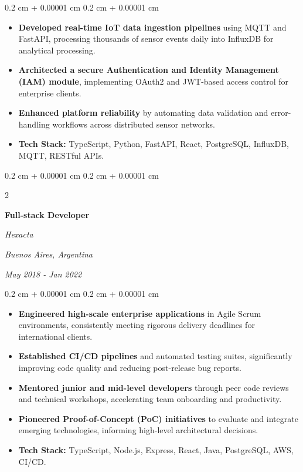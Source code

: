 \documentclass[10pt, letterpaper]{article}
\newenvironment{highlights}{
    \begin{itemize}[
        topsep=0.10 cm,
        parsep=0.10 cm,
        partopsep=0pt,
        itemsep=0pt,
        leftmargin=0.4 cm + 10pt
    ]
}{
    \end{itemize}
} %
\newenvironment{onecolentry}{
    \begin{adjustwidth}{
        0.2 cm + 0.00001 cm
    }{
        0.2 cm + 0.00001 cm
    }
}{
    \end{adjustwidth}
} %
\newenvironment{twocolentry}[2][]{
    \onecolentry
    \def\secondColumn{#2}
    \setcolumnwidth{\fill, 4.5 cm}
    \begin{paracol}{2}
}{
    \switchcolumn \raggedleft \secondColumn
    \end{paracol}
    \endonecolentry
} %
\begin{document}
        \vspace{0.10 cm}
        \begin{onecolentry}
            \begin{highlights}
                \item \textbf{Developed real-time IoT data ingestion pipelines} using MQTT and FastAPI, processing thousands of sensor events daily into InfluxDB for analytical processing.
                \item \textbf{Architected a secure Authentication and Identity Management (IAM) module}, implementing OAuth2 and JWT-based access control for enterprise clients.
                \item \textbf{Enhanced platform reliability} by automating data validation and error-handling workflows across distributed sensor networks.
                \item \textbf{Tech Stack:} TypeScript, Python, FastAPI, React, PostgreSQL, InfluxDB, MQTT, RESTful APIs.
            \end{highlights}
        \end{onecolentry}


        \vspace{0.2 cm}

        \begin{twocolentry}{
        \textit{Buenos Aires, Argentina}

        \textit{May 2018 - Jan 2022}}
            \textbf{Full-stack Developer}

            \textit{Hexacta}
        \end{twocolentry}

        \vspace{0.10 cm}
        \begin{onecolentry}
            \begin{highlights}
                \item \textbf{Engineered high-scale enterprise applications} in Agile Scrum environments, consistently meeting rigorous delivery deadlines for international clients.
                \item \textbf{Established CI/CD pipelines} and automated testing suites, significantly improving code quality and reducing post-release bug reports.
                \item \textbf{Mentored junior and mid-level developers} through peer code reviews and technical workshops, accelerating team onboarding and productivity.
                \item \textbf{Pioneered Proof-of-Concept (PoC) initiatives} to evaluate and integrate emerging technologies, informing high-level architectural decisions.
                \item \textbf{Tech Stack:} TypeScript, Node.js, Express, React, Java, PostgreSQL, AWS, CI/CD.
            \end{highlights}
        \end{onecolentry}
\end{document}
